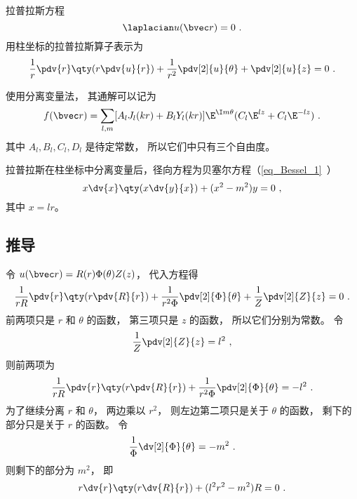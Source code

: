 

拉普拉斯方程
\begin{equation}
\laplacian u(\bvec r) = 0~.
\end{equation}
用柱坐标的拉普拉斯算子表示为
\begin{equation}
\frac{1}{r}\pdv{r}\qty(r \pdv{u}{r}) + \frac{1}{r^2} \pdv[2]{u}{\theta} + \pdv[2]{u}{z} = 0~.
\end{equation}

使用分离变量法， 其通解可以记为
\begin{equation}
f(\bvec r) = \sum_{l,m} [A_l J_l(kr) + B_l Y_l(kr)]\E^{\I m \theta} (C_l\E^{lz} + C_l \E^{-lz})~.
\end{equation}
其中 $A_l, B_l, C_l, D_l$ 是待定常数， 所以它们中只有三个自由度。

拉普拉斯在柱坐标中分离变量后，径向方程为贝塞尔方程（\autoref{eq_Bessel_1}~）
\begin{equation}
x \dv{x} \qty(x \dv{y}{x}) + (x^2 - m^2)y = 0~,
\end{equation}
其中 $x = lr$。

\subsection{推导}
令 $u(\bvec r) = R(r) \Phi(\theta) Z(z)$， 代入方程得
\begin{equation}
\frac{1}{rR}\pdv{r} \qty(r\pdv{R}{r}) + \frac{1}{r^2 \Phi} \pdv[2]{\Phi}{\theta} + \frac{1}{Z} \pdv[2]{Z}{z} = 0~.
\end{equation}
前两项只是 $r$ 和 $\theta $ 的函数， 第三项只是 $z$ 的函数， 所以它们分别为常数。 令
\begin{equation}\label{eq_CylLap_4}
\frac{1}{Z} \pdv[2]{Z}{z} = l^2~,
\end{equation}
则前两项为
\begin{equation}
\frac{1}{rR} \pdv{r} \qty(r\pdv{R}{r}) + \frac{1}{r^2 \Phi} \pdv[2]{\Phi}{\theta} =  - l^2~.
\end{equation}
为了继续分离 $r$ 和 $\theta$， 两边乘以 $r^2$，   则左边第二项只是关于 $\theta$  的函数， 剩下的部分只是关于 $r$ 的函数。 令
\begin{equation}\label{eq_CylLap_6}
\frac{1}{\Phi } \dv[2]{\Phi}{\theta} = -m^2~.
\end{equation}
则剩下的部分为 $m^2$， 即
\begin{equation}\label{eq_CylLap_7}
r \dv{r} \qty(r\dv{R}{r}) + (l^2 r^2 - m^2)R = 0~.
\end{equation}

